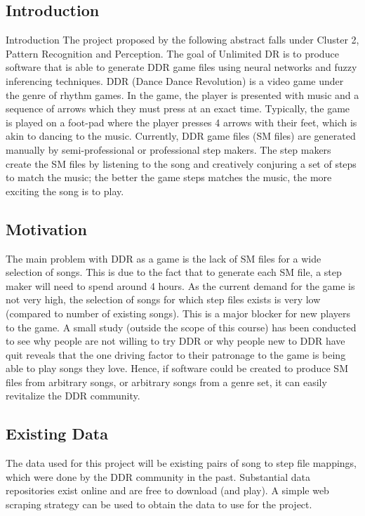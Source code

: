 \subsection{Introduction}

Introduction
The project proposed by the following abstract falls under Cluster 2, Pattern Recognition and
Perception. The goal of Unlimited DR is to produce software that is able to generate DDR game
files using neural networks and fuzzy inferencing techniques.
DDR (Dance Dance Revolution) is a video game under the genre of rhythm games. In the game,
the player is presented with music and a sequence of arrows which they must press at an exact
time. Typically, the game is played on a foot-pad where the player presses 4 arrows with their
feet, which is akin to dancing to the music. Currently, DDR game files (SM files) are generated
manually by semi-professional or professional step makers. The step makers create the SM files
by listening to the song and creatively conjuring a set of steps to match the music; the better
the game steps matches the music, the more exciting the song is to play.


\subsection{Motivation}
The main problem with DDR as a game is the lack of SM files for a wide selection of songs. This
is due to the fact that to generate each SM file, a step maker will need to spend around 4 hours.
As the current demand for the game is not very high, the selection of songs for which step files
exists is very low (compared to number of existing songs). This is a major blocker for new
players to the game. A small study (outside the scope of this course) has been conducted to see
why people are not willing to try DDR or why people new to DDR have quit reveals that the one
driving factor to their patronage to the game is being able to play songs they love. Hence, if
software could be created to produce SM files from arbitrary songs, or arbitrary songs from a
genre set, it can easily revitalize the DDR community.

\subsection{Existing Data}
The data used for this project will be existing pairs of song to step file mappings, which were
done by the DDR community in the past. Substantial data repositories exist online and are free to
download (and play). A simple web scraping strategy can be used to obtain the data to use for the
project.

